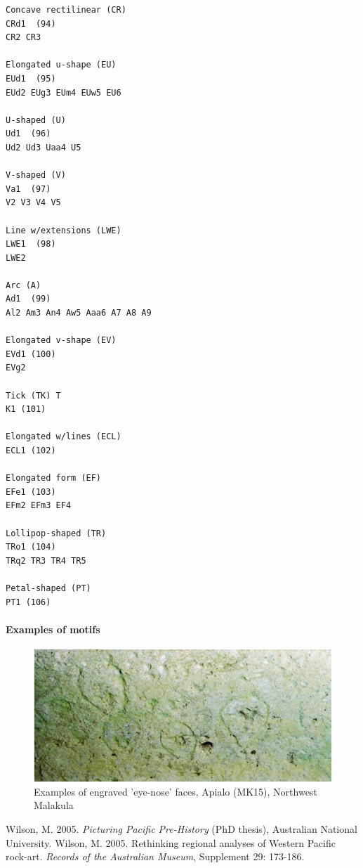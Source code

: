 \documentclass{article}
\begin{document}
\begin{verbatim}
Concave rectilinear (CR) 
CRd1  (94)
CR2 CR3 

Elongated u-shape (EU) 
EUd1  (95)
EUd2 EUg3 EUm4 EUw5 EU6 

U-shaped (U) 
Ud1  (96)
Ud2 Ud3 Uaa4 U5 

V-shaped (V)
Va1  (97)
V2 V3 V4 V5 

Line w/extensions (LWE) 
LWE1  (98)
LWE2 

Arc (A) 
Ad1  (99)
Al2 Am3 An4 Aw5 Aaa6 A7 A8 A9 

Elongated v-shape (EV) 
EVd1 (100)
EVg2 

Tick (TK) T
K1 (101)

Elongated w/lines (ECL) 
ECL1 (102)

Elongated form (EF) 
EFe1 (103)
EFm2 EFm3 EF4

Lollipop-shaped (TR) 
TRo1 (104)
TRq2 TR3 TR4 TR5 

Petal-shaped (PT) 
PT1 (106)
\end{verbatim}

\paragraph{Examples of motifs}
\begin{figure}[h]
\includegraphics{plate12}
\caption{Examples of engraved 'eye-nose' faces, Apialo (MK15), Northwest 
Malakula}
\end{figure}
     


\begin{thebibliography}{99}
 Wilson, M. 2005.
\emph{Picturing Pacific Pre-History} (PhD thesis), 
Australian National University.
 Wilson, M. 2005.
Rethinking regional analyses of Western Pacific rock-art. 
\emph{Records of the Australian Museum}, Supplement 29: 173-186.
\end{thebibliography}
\end{document}

